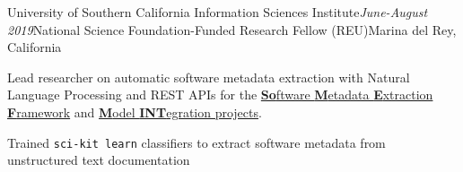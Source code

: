 \begin{rSubsection}{University of Southern California Information Sciences Institute}{\em June-August 2019}{National Science Foundation-Funded Research Fellow (REU)}{Marina del Rey, California} 
\item Lead researcher on automatic software metadata extraction  with Natural Language Processing and REST APIs for the \href{https://github.com/KnowledgeCaptureAndDiscovery/somef}{\textbf{So}ftware \textbf{M}etadata \textbf{E}xtraction \textbf{F}ramework} and \href{http://mint-project.info/}{\textbf{M}odel \textbf{INT}egration projects}.
\item Trained \texttt{sci-kit learn} classifiers to extract software metadata from unstructured text documentation 
\end{rSubsection}